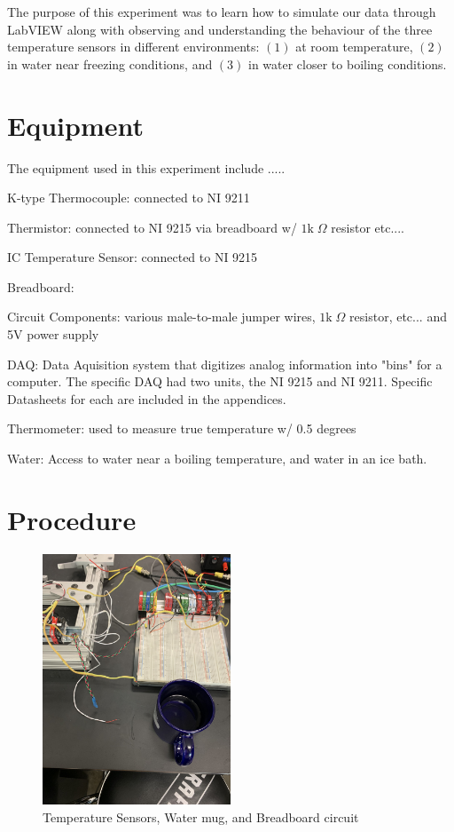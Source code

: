\documentclass{article}
\begin{document}
The purpose of this experiment was to learn how to simulate our data through LabVIEW along with observing and understanding the behaviour of the three temperature sensors in different environments: $(1)$ at room temperature, $(2)$ in water near freezing conditions, and $(3)$ in water closer to boiling conditions. 

\section{Equipment}
The equipment used in this experiment include .....

K-type Thermocouple:  connected to NI 9211

Thermistor:  connected to NI 9215 via breadboard w/ $1\text{k}\;\Omega$ resistor etc....

IC Temperature Sensor: connected to NI 9215

Breadboard: 

Circuit Components:  various male-to-male jumper wires, $1\text{k}\;\Omega$ resistor, etc... and 5V power supply

DAQ:  Data Aquisition system that digitizes analog information into "bins" for a computer.  The specific DAQ had two units, the NI 9215 and NI 9211.  Specific Datasheets for each are included in the appendices.  

Thermometer:  used to measure true temperature w/ 0.5 degrees 

Water:  Access to water near a boiling temperature, and water in an ice bath.   




\section{Procedure}
\begin{figure}[H]
\centering
\includegraphics[width=0.5\textwidth, angle = -90]{Lab 2/lab2images/circuit_board_mug_and_sensors.jpg}
\caption{Temperature Sensors, Water mug, and Breadboard circuit}
\end{figure}
\end{document}
